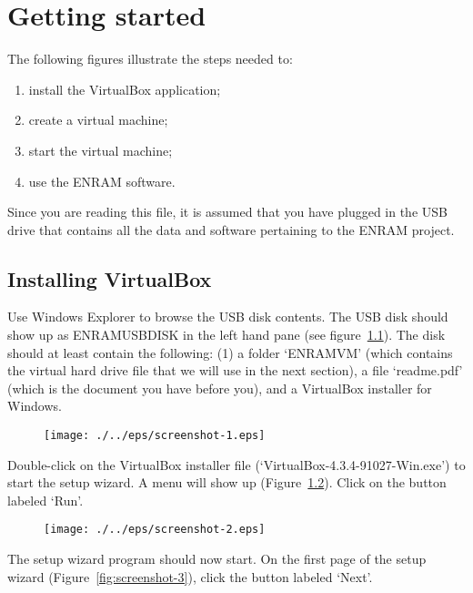 \chapter{Getting started}

The following figures illustrate the steps needed to:
\begin{enumerate}
\item{install the VirtualBox application;}
\item{create a virtual machine;}
\item{start the virtual machine;}
\item{use the ENRAM software.}
\end{enumerate}
Since you are reading this file, it is assumed that you have plugged in the USB drive that contains all the data and software pertaining to the ENRAM project.

\clearpage

\section{Installing VirtualBox}

Use Windows Explorer to browse the USB disk contents. The USB disk should show up as ENRAMUSBDISK in the left hand pane (see figure~\ref{fig:screenshot-1}). The disk should at least contain the following: (1) a folder `ENRAMVM' (which contains the virtual hard drive file that we will use in the next section), a file `readme.pdf' (which is the document you have before you), and a VirtualBox installer for Windows.

\begin{figure}[ht]
  \centering
    \texttt{[image: ./../eps/screenshot-1.eps]}
  \caption{}
  \label{fig:screenshot-1}
\end{figure}


Double-click on the VirtualBox installer file (`VirtualBox-4.3.4-91027-Win.exe') to start the setup wizard. A menu will show up (Figure~\ref{fig:screenshot-2}). Click on the button labeled `Run'.

\begin{figure}[ht]
  \centering
    \texttt{[image: ./../eps/screenshot-2.eps]}
  \caption{}
  \label{fig:screenshot-2}
\end{figure}
\clearpage


The setup wizard program should now start. On the first page of the setup wizard (Figure~\ref{fig:screenshot-3}), click the button labeled `Next'.

